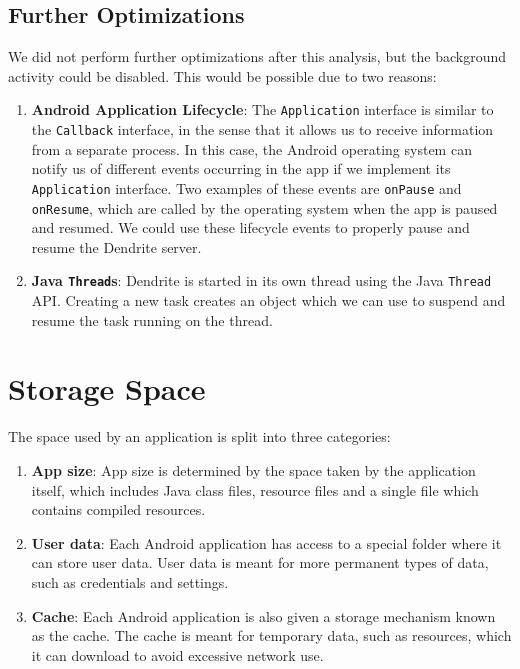 \subsection{Further Optimizations}
We did not perform further optimizations after this analysis, but the background activity could be disabled.
This would be possible due to two reasons:
\begin{enumerate}
	\item{
	      \textbf{Android Application Lifecycle}:
	      The \texttt{Application} interface is similar to the \texttt{Callback} interface, in the sense that it allows us to receive information from a separate process.
	      In this case, the Android operating system can notify us of different events occurring in the app if we implement its \texttt{Application} interface.
	      Two examples of these events are \texttt{onPause} and \texttt{onResume}, which are called by the operating system when the app is paused and resumed.
	      We could use these lifecycle events to properly pause and resume the Dendrite server.
	      }
	\item{
	      \textbf{Java \texttt{Thread}s}:
	      Dendrite is started in its own thread using the Java \texttt{Thread} \ac{API}\@.
	      Creating a new task creates an object which we can use to suspend and resume the task running on the thread.
	      }
\end{enumerate}

\section{Storage Space}\label{sec:storage_space}
The space used by an application is split into three categories:
\begin{enumerate}
	\item{
	      \textbf{App size}:
	      App size is determined by the space taken by the application itself, which includes Java class files, resource files and a single file which contains compiled resources\cite{android_devdocs_apksize}.
	      }
	\item{
	      \textbf{User data}:
	      Each Android application has access to a special folder where it can store user data.
	      User data is meant for more permanent types of data, such as credentials and settings.
	      }
	\item{
	      \textbf{Cache}:
	      Each Android application is also given a storage mechanism known as the cache.
	      The cache is meant for temporary data, such as resources, which it can download to avoid excessive network use.
	      }
\end{enumerate}

